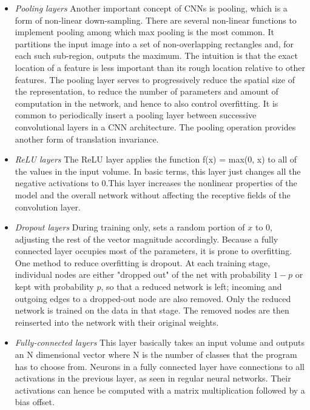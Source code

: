 \documentclass[hidelinks,12pt,a4paper]{report}
\begin{document}
\begin{itemize}
\item \textit{Pooling layers}
Another important concept of CNNs is pooling, which is a form of non-linear down-sampling. There are several non-linear functions to implement pooling among which max pooling is the most common. It partitions the input image into a set of non-overlapping rectangles and, for each such sub-region, outputs the maximum. The intuition is that the exact location of a feature is less important than its rough location relative to other features. The pooling layer serves to progressively reduce the spatial size of the representation, to reduce the number of parameters and amount of computation in the network, and hence to also control overfitting. It is common to periodically insert a pooling layer between successive convolutional layers in a CNN architecture. The pooling operation provides another form of translation invariance.
\item \textit{ReLU layers}
The ReLU layer applies the function f(x) = max(0, x) to all of the values in the input volume. In basic terms, this layer just changes all the negative activations to 0.This layer increases the nonlinear properties of the model and the overall network without affecting the receptive fields of the convolution layer.
\item \textit{Dropout layers}
During training only, sets a random portion of $x$ to 0, adjusting the rest of the vector magnitude accordingly.
Because a fully connected layer occupies most of the parameters, it is prone to overfitting. One method to reduce overfitting is dropout. At each training stage, individual nodes are either "dropped out" of the net with probability $ 1-p$ or kept with probability $p$, so that a reduced network is left; incoming and outgoing edges to a dropped-out node are also removed. Only the reduced network is trained on the data in that stage. The removed nodes are then reinserted into the network with their original weights.
\item \textit{Fully-connected layers}
This layer basically takes an input volume and outputs an N dimensional vector where N is the number of classes that the program has to choose from. Neurons in a fully connected layer have connections to all activations in the previous layer, as seen in regular neural networks. Their activations can hence be computed with a matrix multiplication followed by a bias offset.
\end{itemize}



\end{document}
